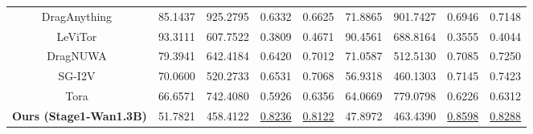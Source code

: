 \begin{table}[h]
{\begin{tabular}{c|cccc|cccc}
DragAnything~\cite{wu2024draganything}                          & 85.1437                              & 925.2795                              & 0.6332                                    & 0.6625                                    & 71.8865                              & 901.7427                              & 0.6946                                    & 0.7148                                   \\
LeViTor~\cite{wang2025levitor}                                  & 93.3111                              & 607.7522                              & 0.3809                                    & 0.4671                                    & 90.4561                              & 688.8164                              & 0.3555                                    & 0.4044                                   \\
DragNUWA~\cite{yin2023dragnuwa}                                 & 79.3941                              & 642.4184                              & 0.6420                                    & 0.7012                                    & 71.0587                              & 512.5130                              & 0.7085                                    & 0.7250                                   \\
SG-I2V~\cite{namekata2024sgi2v}                                 & 70.0600                              & 520.2733                              & 0.6531                                    & 0.7068                                    & 56.9318                               & 460.1303                              & 0.7145                                    & 0.7423                                   \\
Tora~\cite{zhang2025tora} & 66.6571                              & 742.4080                              & 0.5926                                    & 0.6356                                    & 64.0669                              & 779.0798                              & 0.6226                                    & 0.6312                                   \\ \hline
\textbf{Ours (Stage1-Wan1.3B)}                                                        & 51.7821                          & 458.4122                          & \underline{0.8236}                          & \underline{0.8122}                          & 47.8972                          & 463.4390                          & \underline{0.8598}                          & \underline{0.8288}                          \\

\end{tabular}}
\end{table}
